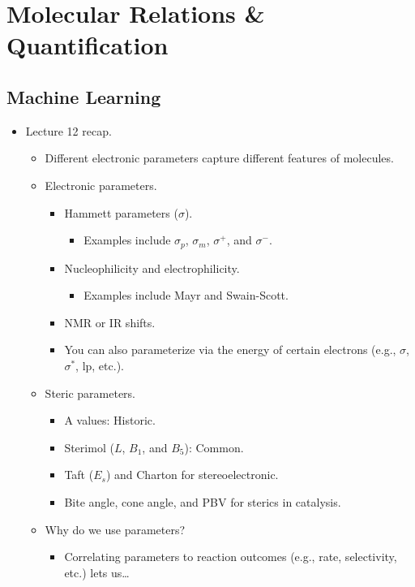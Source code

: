 \documentclass[../notes.tex]{subfiles}
\begin{document}
\chapter{Molecular Relations \& Quantification}
\section{Machine Learning}
\begin{itemize}
    \item {}Lecture 12 recap.
    \begin{itemize}
        \item Different electronic parameters capture different features of molecules.
        \item Electronic parameters.
        \begin{itemize}
            \item Hammett parameters ($\sigma$).
            \begin{itemize}
                \item Examples include $\sigma_p$, $\sigma_m$, $\sigma^+$, and $\sigma^-$.
            \end{itemize}
            \item Nucleophilicity and electrophilicity.
            \begin{itemize}
                \item Examples include Mayr and Swain-Scott.
            \end{itemize}
            \item NMR or IR shifts.
            \item You can also parameterize via the energy of certain electrons (e.g., $\sigma$, $\sigma^*$, lp, etc.).
        \end{itemize}
        \item Steric parameters.
        \begin{itemize}
            \item A values: Historic.
            \item Sterimol ($L$, $B_1$, and $B_5$): Common.
            \item Taft ($E_s$) and Charton for stereoelectronic.
            \item Bite angle, cone angle, and PBV for sterics in catalysis.
        \end{itemize}
        \item Why do we use parameters?
        \begin{itemize}
            \item Correlating parameters to reaction outcomes (e.g., rate, selectivity, etc.) lets us\dots

\end{itemize}
\end{itemize}
\end{itemize}
\end{document}
